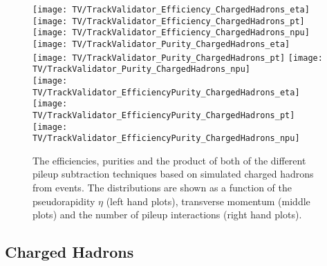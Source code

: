 

\clearpage{}

\begin{figure}[Hb]
    \centering
    \texttt{[image: TV/TrackValidator\_Efficiency\_ChargedHadrons\_eta]}
    \texttt{[image: TV/TrackValidator\_Efficiency\_ChargedHadrons\_pt]}
    \texttt{[image: TV/TrackValidator\_Efficiency\_ChargedHadrons\_npu]}
    \\
    \texttt{[image: TV/TrackValidator\_Purity\_ChargedHadrons\_eta]}
    \texttt{[image: TV/TrackValidator\_Purity\_ChargedHadrons\_pt]}
    \texttt{[image: TV/TrackValidator\_Purity\_ChargedHadrons\_npu]}
    \\
    \texttt{[image: TV/TrackValidator\_EfficiencyPurity\_ChargedHadrons\_eta]}
    \texttt{[image: TV/TrackValidator\_EfficiencyPurity\_ChargedHadrons\_pt]}
    \texttt{[image: TV/TrackValidator\_EfficiencyPurity\_ChargedHadrons\_npu]}
    \caption[Efficiencies, purities and their product of the different pileup subtraction techniques based on simulated charged hadrons from \ttbar events]{The efficiencies, purities and the product of both of the different pileup subtraction techniques based on simulated charged hadrons from \ttbar events. The distributions are shown as a function of the pseudorapidity $\eta$ (left hand plots), transverse momentum (middle plots) and the number of pileup interactions (right hand plots). \label{plot:TACOACHSignal}}
\end{figure}

\subsection{Charged Hadrons \label{sec:TASEFRDACH}}

